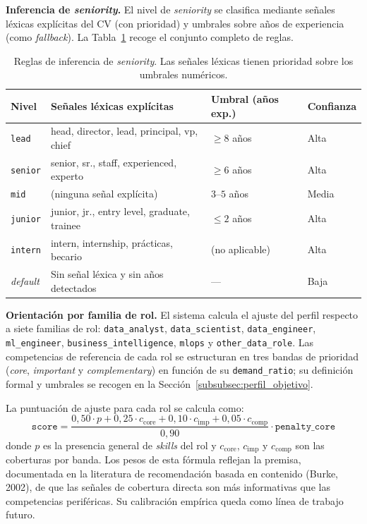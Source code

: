 \textbf{Inferencia de \textit{seniority}.} El nivel de \textit{seniority} se clasifica mediante señales léxicas explícitas del CV (con prioridad) y umbrales sobre años de experiencia (como \textit{fallback}). La Tabla~\ref{tab:tabla3_3} recoge el conjunto completo de reglas.

\begin{table}[H]
  \caption{Reglas de inferencia de \textit{seniority}. Las señales léxicas tienen prioridad sobre los umbrales numéricos.}
  \label{tab:tabla3_3}
  \centering
  \footnotesize
  \begin{tabular}{|p{2.2cm}|p{5.5cm}|p{3.5cm}|p{2.0cm}|}
    \hline
    \rowcolor{gray!15}
    \textbf{Nivel} & \textbf{Señales léxicas explícitas} & \textbf{Umbral (años exp.)} & \textbf{Confianza} \\
    \hline
    \texttt{lead}   & head, director, lead, principal, vp, chief & $\geq 8$ años              & Alta \\
    \hline
    \texttt{senior} & senior, sr., staff, experienced, experto   & $\geq 6$ años              & Alta \\
    \hline
    \texttt{mid}    & (ninguna señal explícita)                  & $3$--$5$ años              & Media \\
    \hline
    \texttt{junior} & junior, jr., entry level, graduate, trainee & $\leq 2$ años             & Alta \\
    \hline
    \texttt{intern} & intern, internship, prácticas, becario     & (no aplicable)             & Alta \\
    \hline
    \textit{default} & Sin señal léxica y sin años detectados   & ---                        & Baja \\
    \hline
  \end{tabular}
\end{table}

\textbf{Orientación por familia de rol.} El sistema calcula el ajuste del perfil respecto a siete familias de rol: \texttt{data\_analyst}, \texttt{data\_scientist}, \texttt{data\_engineer}, \texttt{ml\_engineer}, \texttt{business\_intelligence}, \texttt{mlops} y \texttt{other\_data\_role}. Las competencias de referencia de cada rol se estructuran en tres bandas de prioridad (\textit{core}, \textit{important} y \textit{complementary}) en función de su \texttt{demand\_ratio}; su definición formal y umbrales se recogen en la Sección~\ref{subsubsec:perfil_objetivo}.

La puntuación de ajuste para cada rol se calcula como:
\[
  \texttt{score} = \frac{0{,}50 \cdot p + 0{,}25 \cdot c_{\text{core}} + 0{,}10 \cdot c_{\text{imp}} + 0{,}05 \cdot c_{\text{comp}}}{0{,}90} \cdot \texttt{penalty\_core}
\]
donde $p$ es la presencia general de \textit{skills} del rol y $c_{\text{core}}$, $c_{\text{imp}}$ y $c_{\text{comp}}$ son las coberturas por banda. Los pesos de esta fórmula reflejan la premisa, documentada en la literatura de recomendación basada en contenido (Burke, 2002), de que las señales de cobertura directa son más informativas que las competencias periféricas. Su calibración empírica queda como línea de trabajo futuro.

